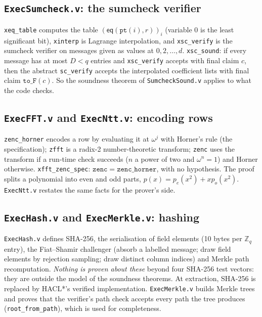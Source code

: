 \documentclass[11pt,a4paper]{article}
\newcommand{\Zq}{\mathbb{Z}_q}
\newcommand{\eq}{\mathsf{eq}}
\theoremstyle{definition}
\theoremstyle{plain}
\begin{document}
\subsection{\texttt{ExecSumcheck.v}: the sumcheck verifier}

\texttt{xeq\_table} computes the table $(\eq(\mathtt{pt}(i),r))_i$ (variable $0$ is the least significant
bit), \texttt{xinterp} is Lagrange interpolation, and \texttt{xsc\_verify} is the sumcheck verifier on
messages given as values at $0,2,\dots,d$.
\texttt{xsc\_sound}: if every message has at most $D<q$ entries and \texttt{xsc\_verify} accepts with final
claim $c$, then the abstract \texttt{sc\_verify} accepts the interpolated coefficient lists with final
claim $\mathtt{to\_F}(c)$. So the soundness theorem of \texttt{SumcheckSound.v} applies to what the code
checks.

\subsection{\texttt{ExecFFT.v} and \texttt{ExecNtt.v}: encoding rows}

\texttt{zenc\_horner} encodes a row by evaluating it at $\omega^j$ with Horner's rule (the
specification); \texttt{zfft} is a radix-2 number-theoretic transform; \texttt{zenc} uses the transform
if a run-time check succeeds ($n$ a power of two and $\omega^n=1$) and Horner otherwise.
\texttt{xfft\_zenc\_spec}: $\mathtt{zenc}=\mathtt{zenc\_horner}$, with no hypothesis. The proof splits a
polynomial into even and odd parts, $p(x)=p_e(x^2)+xp_o(x^2)$. \texttt{ExecNtt.v} restates the same
facts for the prover's side.

\subsection{\texttt{ExecHash.v} and \texttt{ExecMerkle.v}: hashing}

\texttt{ExecHash.v} defines SHA-256, the serialisation of field elements (10 bytes per $\Zq$ entry),
the Fiat--Shamir challenger (absorb a labelled message; draw field elements by rejection sampling;
draw distinct column indices) and Merkle path recomputation. \emph{Nothing is proven about these}
beyond four SHA-256 test vectors: they are outside the model of the soundness theorems. At
extraction, SHA-256 is replaced by HACL*'s verified implementation. \texttt{ExecMerkle.v} builds Merkle
trees and proves that the verifier's path check accepts every path the tree produces
(\texttt{root\_from\_path}), which is used for completeness.
\end{document}
